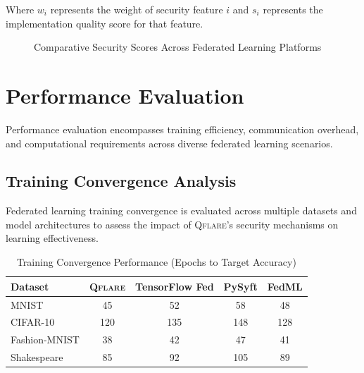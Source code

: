 \documentclass[12pt,a4paper,twoside]{book}
\newcommand{\qflare}{\textsc{Qflare}}
\begin{document}
Where $w_i$ represents the weight of security feature $i$ and $s_i$ represents the implementation quality score for that feature.

\begin{figure}[htbp]
\centering
{}
\caption{Comparative Security Scores Across Federated Learning Platforms}
\label{fig:security-scores}
\end{figure}

\section{Performance Evaluation}
\label{sec:performance-evaluation}

Performance evaluation encompasses training efficiency, communication overhead, and computational requirements across diverse federated learning scenarios.

\subsection{Training Convergence Analysis}
\label{subsec:convergence-analysis}

Federated learning training convergence is evaluated across multiple datasets and model architectures to assess the impact of \qflare{}'s security mechanisms on learning effectiveness.

\begin{table}[htbp]
\centering
\caption{Training Convergence Performance (Epochs to Target Accuracy)}
\label{tab:convergence-performance}
\begin{tabular}{@{}lcccc@{}}
\toprule
Dataset & \qflare{} & TensorFlow Fed & PySyft & FedML \\
\midrule
MNIST & 45 & 52 & 58 & 48 \\
CIFAR-10 & 120 & 135 & 148 & 128 \\
Fashion-MNIST & 38 & 42 & 47 & 41 \\
Shakespeare & 85 & 92 & 105 & 89 \\
\bottomrule
\end{tabular}
\end{table}
\end{document}
